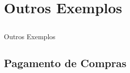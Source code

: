 \section{Outros Exemplos}

\subsection*{}

\begin{frame}
\centering
\Huge Outros Exemplos
\end{frame}

\subsection{Pagamento de Compras}

